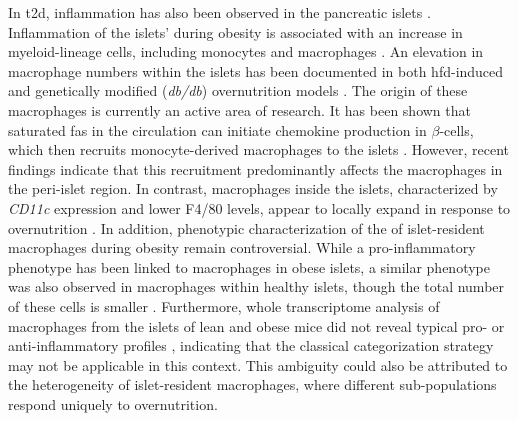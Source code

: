 \par In \gls{t2d}, inflammation has also been observed in the pancreatic islets \textbf{\cite{boni-schnetzler_islet_2019}}. Inflammation of the islets’ during obesity is associated with an increase in myeloid-lineage cells, including monocytes and macrophages \textbf{\cite{eguchi_islet_2017,ying_role_2019}}. An elevation in macrophage numbers within the islets has been documented in both \gls{hfd}-induced \textbf{\cite{ehses_increased_2007}} and genetically modified (\textit{db/db}) overnutrition models \textbf{\cite{cucak_accumulation_2014}}. The origin of these macrophages is currently an active area of research. It has been shown that saturated \glspl{fa} in the circulation can initiate chemokine production in $\beta$-cells, which then recruits monocyte-derived macrophages to the islets \textbf{\cite{eguchi_saturated_2012}}. However, recent findings indicate that this recruitment predominantly affects the macrophages in the peri-islet region. In contrast, macrophages inside the islets, characterized by \textit{CD11c} expression and lower F4/80 levels, appear to locally expand in response to overnutrition \textbf{\cite{ying_expansion_2019}}. In addition, phenotypic characterization of the of islet-resident macrophages during obesity remain controversial. While a pro-inflammatory phenotype has been linked to macrophages in obese islets, a similar phenotype was also observed in macrophages within healthy islets, though the total number of these cells is smaller \textbf{\cite{cucak_accumulation_2014}}. Furthermore, whole transcriptome analysis of macrophages from the islets of lean and obese mice did not reveal typical pro- or anti-inflammatory profiles \textbf{\cite{ying_expansion_2019}}, indicating that the classical categorization strategy may not be applicable in this context. This ambiguity could also be attributed to the heterogeneity of islet-resident macrophages, where different sub-populations respond uniquely to overnutrition.\\

